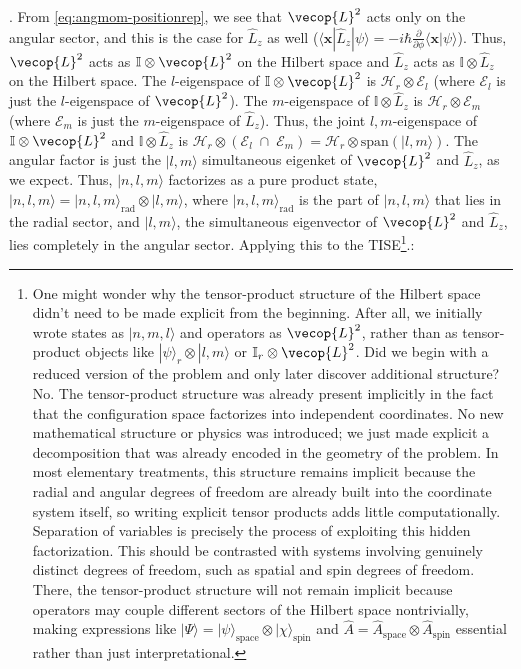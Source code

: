 {}. From \cref{eq:angmom-positionrep}, we see that $\vecop{L}^2$ acts only on the angular sector, and this is the case for $\hat{L}_z$ as well ($\langle \mathbf{x}|\hat{L}_z|\psi\rangle=-i\hbar\frac{\partial}{\partial\phi}\langle\mathbf{x}|\psi\rangle$). Thus, $\vecop{L}^2$ acts as $\mathbb{I}\otimes \vecop{L}^2$ on the Hilbert space and $\hat{L}_z$ acts as $\mathbb{I}\otimes \hat{L}_z$ on the Hilbert space. The $l$-eigenspace of $\mathbb{I}\otimes \vecop{L}^2$ is $\mathcal{H}_r\otimes\mathcal{E}_l$ (where $\mathcal{E}_l$ is just the $l$-eigenspace of $\vecop{L}^2$). The $m$-eigenspace of $\mathbb{I}\otimes \hat{L}_z$ is $\mathcal{H}_r\otimes \mathcal{E}_m$ (where $\mathcal{E}_m$ is just the $m$-eigenspace of $\hat{L}_z$). Thus, the joint $l,m$-eigenspace of $\mathbb{I}\otimes\vecop{L}^2$ and $\mathbb{I}\otimes\hat{L}_z$ is $\mathcal{H}_r\otimes(\mathcal{E}_l\;\cap\;\mathcal{E}_m) = \mathcal{H}_r\otimes\text{span}(|l,m\rangle)$. The angular factor is just the $|l,m\rangle$ simultaneous eigenket of $\vecop{L}^2$ and $\hat{L}_z$, as we expect. Thus, $|n,l,m\rangle$ factorizes as a pure product state, $|n,l,m\rangle=|n,l,m\rangle_\text{rad}\otimes|l,m\rangle$, where $|n,l,m\rangle_\text{rad}$ is the part of $|n,l,m\rangle$ that lies in the radial sector, and $|l,m\rangle$, the simultaneous eigenvector of $\vecop{L}^2$ and $\hat{L}_z$, lies completely in the angular sector. Applying this to the TISE\footnote{
One might wonder why the tensor-product structure of the Hilbert space didn't need to be made explicit from the beginning. After all, we initially wrote states as $|n,m,l\rangle$ and operators as $\vecop{L}^2$, rather than as tensor-product objects like $|\psi\rangle_r\otimes|l,m\rangle$ or $\mathbb{I}_r\otimes\vecop{L}^2$. Did we begin with a reduced version of the problem and only later discover additional structure? No. The tensor-product structure was already present implicitly in the fact that the configuration space factorizes into independent coordinates. No new mathematical structure or physics was introduced; we just made explicit a decomposition that was already encoded in the geometry of the problem. In most elementary treatments, this structure remains implicit because the radial and angular degrees of freedom are already built into the coordinate system itself, so writing explicit tensor products adds little computationally. Separation of variables is precisely the process of exploiting this hidden factorization. This should be contrasted with systems involving genuinely distinct degrees of freedom, such as spatial and spin degrees of freedom. There, the tensor-product structure will not remain implicit because operators may couple different sectors of the Hilbert space nontrivially, making expressions like $|\Psi\rangle=|\psi\rangle_\text{space}\otimes|\chi\rangle_\text{spin}$ and $\hat{A}=\hat{A}_\text{space}\otimes \hat{A}_\text{spin}$ essential rather than just interpretational.
}.:
